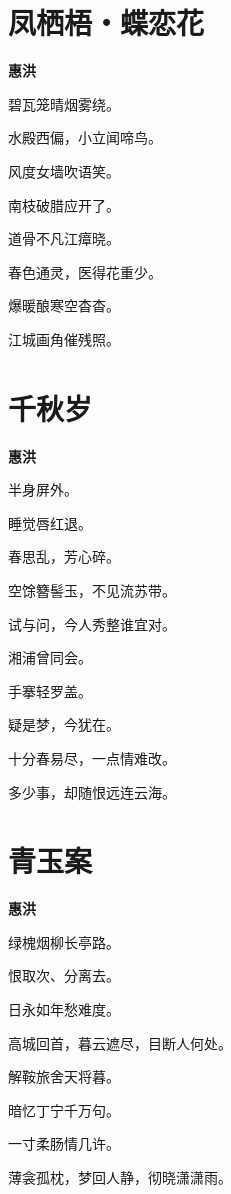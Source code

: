 \documentclass[12pt,a4paper]{ctexbook}
\begin{document}
\section{凤栖梧・蝶恋花}
\textbf{惠洪}\par\vspace{0.5em}
碧瓦笼晴烟雾绕。\par
水殿西偏，小立闻啼鸟。\par
风度女墙吹语笑。\par
南枝破腊应开了。\par
道骨不凡江瘴晓。\par
春色通灵，医得花重少。\par
爆暖酿寒空杳杳。\par
江城画角催残照。\par

\section{千秋岁}
\textbf{惠洪}\par\vspace{0.5em}
半身屏外。\par
睡觉唇红退。\par
春思乱，芳心碎。\par
空馀簪髻玉，不见流苏带。\par
试与问，今人秀整谁宜对。\par
湘浦曾同会。\par
手搴轻罗盖。\par
疑是梦，今犹在。\par
十分春易尽，一点情难改。\par
多少事，却随恨远连云海。\par

\section{青玉案}
\textbf{惠洪}\par\vspace{0.5em}
绿槐烟柳长亭路。\par
恨取次、分离去。\par
日永如年愁难度。\par
高城回首，暮云遮尽，目断人何处。\par
解鞍旅舍天将暮。\par
暗忆丁宁千万句。\par
一寸柔肠情几许。\par
薄衾孤枕，梦回人静，彻晓潇潇雨。\par
\end{document}
